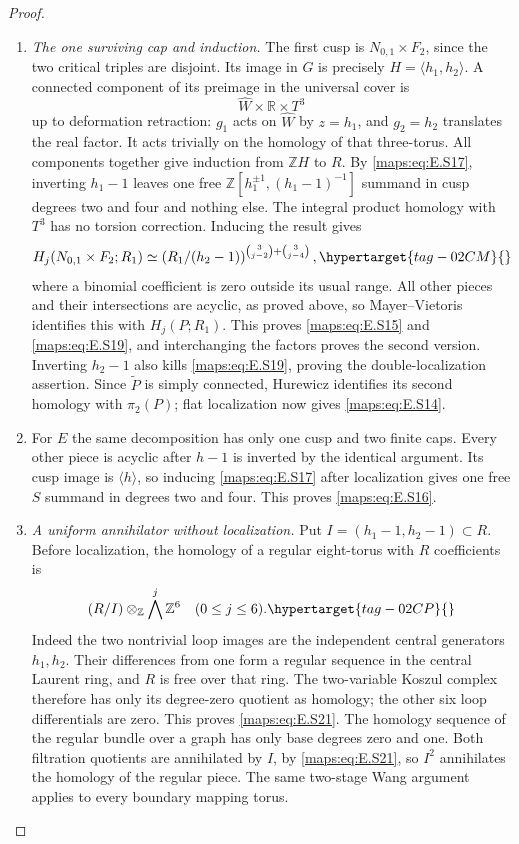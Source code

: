 \documentclass[11pt,a4paper]{article}
\numberwithin{equation}{section}
\theoremstyle{definition}
\begin{document}
\begin{proof}
\begin{enumerate}[label=\arabic*.,leftmargin=*]
\item \emph{The one surviving cap and induction.}
The first cusp is $N_{0,1}\times F_2$, since the two critical
triples are disjoint. Its image in $G$ is precisely
$H=\langle h_1,h_2\rangle$. A connected component of its
preimage in the universal cover is
\[
                \widehat W\times\mathbb R\times T^3
\]
up to deformation retraction: $g_1$ acts on $\widehat W$ by
$z=h_1$, and $g_2=h_2$ translates the real factor. It acts
trivially on the homology of that three-torus. All
components together give induction from $\mathbb ZH$ to
$R$. By \eqref{maps:eq:E.S17}, inverting $h_1-1$ leaves one free
$\mathbb Z[h_1^{\pm1},(h_1-1)^{-1}]$ summand in cusp degrees
two and four and nothing else. The integral product homology
with $T^3$ has no torsion correction. Inducing the result gives
\begin{equation}
 H_j(N_{0,1}\times F_2;R_1)
   \simeq
 \left(R_1/(h_2-1)\right)^{
           \binom3{j-2}+\binom3{j-4}},
 \hypertarget{tag-02CM}{}\label{maps:eq:E.S19}
\end{equation}
where a binomial coefficient is zero outside its usual range.
All other pieces and their intersections are acyclic, as
proved above, so Mayer--Vietoris identifies this with
$H_j(P;R_1)$. This proves \eqref{maps:eq:E.S15} and \eqref{maps:eq:E.S19}, and interchanging
the factors proves the second version. Inverting $h_2-1$
also kills \eqref{maps:eq:E.S19}, proving the double-localization assertion.
Since $\widetilde P$ is simply connected, Hurewicz identifies
its second homology with $\pi_2(P)$; flat localization now
gives \eqref{maps:eq:E.S14}.

\item For $E$ the same decomposition has only one cusp and two
finite caps. Every other piece is acyclic after $h-1$ is
inverted by the identical argument. Its cusp image is
$\langle h\rangle$, so inducing \eqref{maps:eq:E.S17} after localization
gives one free $S$ summand in degrees two and four. This
proves \eqref{maps:eq:E.S16}.

\item \emph{A uniform annihilator without localization.}
Put $I=(h_1-1,h_2-1)\subset R$. Before localization, the homology
of a regular eight-torus with $R$ coefficients is
\begin{equation}
                 (R/I)\otimes_{\mathbb Z}\bigwedge^j\mathbb Z^6
                      \quad(0\leq j\leq6).
 \hypertarget{tag-02CP}{}\label{maps:eq:E.S21}
\end{equation}
Indeed the two nontrivial loop images are the independent central
generators $h_1,h_2$. Their differences from one form a regular
sequence in the central Laurent ring, and $R$ is free over that
ring. The two-variable Koszul complex therefore has only its
degree-zero quotient as homology; the other six loop differentials
are zero. This proves \eqref{maps:eq:E.S21}.
The homology sequence of the regular bundle over a graph has
only base degrees zero and one. Both filtration quotients are
annihilated by $I$, by \eqref{maps:eq:E.S21}, so $I^2$ annihilates the homology
of the regular piece. The same two-stage Wang argument applies
to every boundary mapping torus. 


\end{enumerate}
\end{proof}
\end{document}
